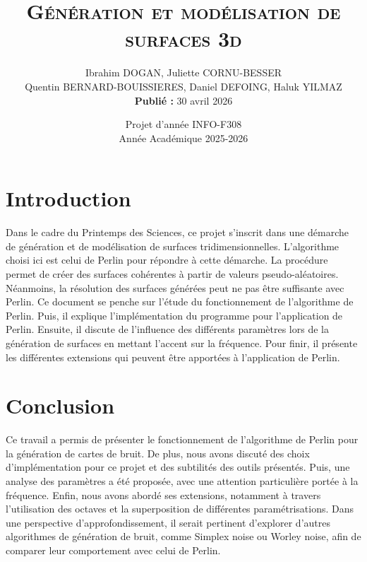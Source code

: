 \documentclass[
	a4paper, %
	9pt, %
	unnumberedsections, %
	twoside, %
]{LTJournalArticle}
\title{\textbf{\textsc{\Huge Génération et modélisation de surfaces 3d}}} %
\author{%
	Ibrahim DOGAN, Juliette CORNU-BESSER\\ Quentin BERNARD-BOUISSIERES, Daniel DEFOING, Haluk YILMAZ \\ \textbf{Publié :} 30 avril 2026 }
\date{Projet d'année INFO-F308\\ Année Académique 2025-2026}
\begin{document}
\maketitle %


\section{Introduction}

Dans le cadre du Printemps des Sciences, ce projet s’inscrit dans une démarche de génération et de modélisation de surfaces tridimensionnelles.
L'algorithme choisi ici est celui de Perlin pour répondre à cette démarche.
La procédure permet de créer des surfaces cohérentes à partir de valeurs pseudo-aléatoires.
Néanmoins, la résolution des surfaces générées peut ne pas être suffisante avec Perlin.
Ce document se penche sur l’étude du fonctionnement de l’algorithme de Perlin.
Puis, il explique l'implémentation du programme pour l'application de Perlin.
Ensuite, il discute de l'influence des différents paramètres lors de la génération de surfaces en mettant l'accent sur la fréquence.
Pour finir, il présente les différentes extensions qui peuvent être apportées à l'application de Perlin.











\section{Conclusion}

Ce travail a permis de présenter le fonctionnement de l’algorithme de Perlin pour la génération de cartes de bruit.
De plus, nous avons discuté des choix d'implémentation pour ce projet et des subtilités des outils présentés.
Puis, une analyse des paramètres a été proposée, avec une attention particulière portée à la fréquence.
Enfin, nous avons abordé ses extensions, notamment à travers l’utilisation des octaves et la superposition de différentes paramétrisations.
Dans une perspective d’approfondissement, il serait pertinent d’explorer d’autres algorithmes de génération de bruit, comme Simplex noise ou Worley noise, afin de comparer leur comportement avec celui de Perlin.

\end{document}

